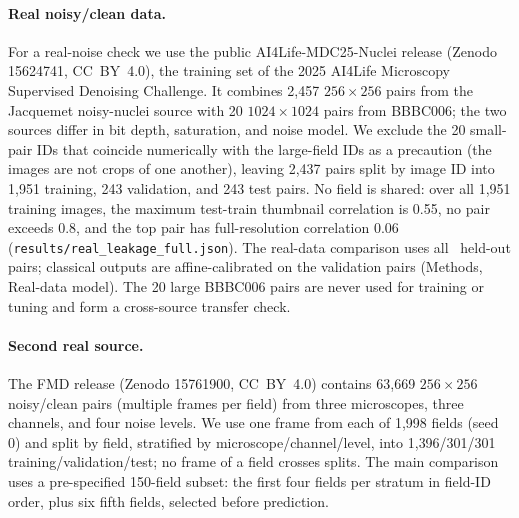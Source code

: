 \documentclass[preprint,12pt]{elsarticle}
\begin{document}
\paragraph{Real noisy/clean data.}
For a real-noise check we use the public AI4Life-MDC25-Nuclei release
\cite{ai4life_mdc25_2025} (Zenodo 15624741, CC~BY~4.0), the training set of the
2025 AI4Life Microscopy Supervised Denoising Challenge. It combines 2{,}457
$256\times256$ pairs from the Jacquemet noisy-nuclei source with 20
$1024\times1024$ pairs from BBBC006; the two sources differ in bit depth,
saturation, and noise model. We exclude the 20 small-pair IDs that coincide
numerically with the large-field IDs as a precaution (the images are not crops
of one another), leaving 2{,}437 pairs split by image ID into 1{,}951 training,
243 validation, and 243 test pairs. No field is shared: over all 1{,}951
training images, the maximum test-train thumbnail correlation is 0.55, no pair
exceeds 0.8, and the top pair has full-resolution correlation 0.06
(\texttt{results/real\_leakage\_full.json}). The
real-data comparison uses all \RealN\ held-out pairs; classical outputs are
affine-calibrated on the validation pairs (Methods, Real-data model). The 20
large BBBC006 pairs are never used for training
or tuning and form a cross-source transfer check.

\paragraph{Second real source.}
The FMD release \cite{zhang2019fmd,ai4life_mdc25_fmd_2025} (Zenodo 15761900, CC~BY~4.0)
contains 63{,}669 $256\times256$ noisy/clean pairs (multiple frames per field)
from three microscopes, three channels, and four noise levels. We use one frame
from each of 1{,}998 fields (seed 0) and split by field, stratified by
microscope/channel/level, into 1{,}396/301/301
training/validation/test; no frame of a field crosses splits. The main
comparison uses a pre-specified 150-field subset: the first four fields per
stratum in field-ID order, plus six fifth fields, selected before prediction.
\end{document}
